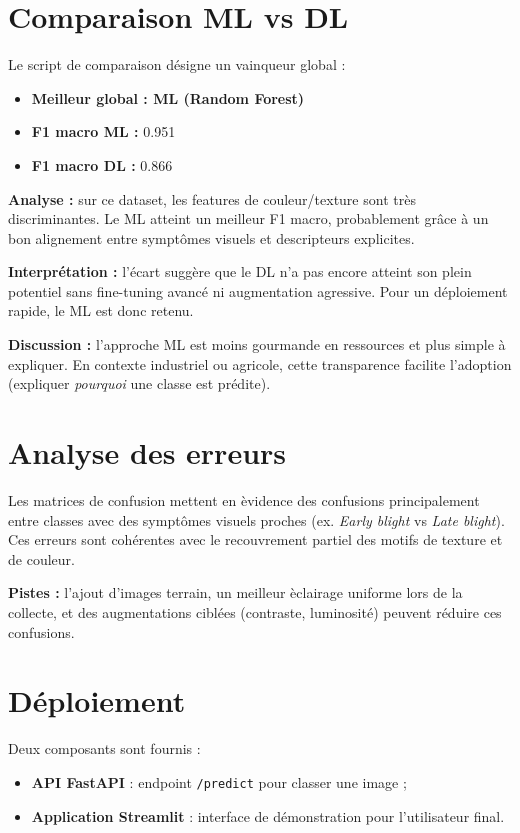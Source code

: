 \documentclass[12pt,a4paper]{article}
\begin{document}
\section{Comparaison ML vs DL}
Le script de comparaison d\'esigne un vainqueur global :
\begin{itemize}[leftmargin=*]
    \item \textbf{Meilleur global : ML (Random Forest)}
    \item \textbf{F1 macro ML :} 0.951
    \item \textbf{F1 macro DL :} 0.866
\end{itemize}

\textbf{Analyse :} sur ce dataset, les features de couleur/texture sont tr\`es discriminantes. Le ML atteint un meilleur F1 macro, probablement gr\^ace \`a un bon alignement entre sympt\^omes visuels et descripteurs explicites.

\textbf{Interpr\'etation :} l'\'ecart sugg\`ere que le DL n'a pas encore atteint son plein potentiel sans fine-tuning avanc\'e ni augmentation agressive. Pour un d\'eploiement rapide, le ML est donc retenu.

\textbf{Discussion :} l'approche ML est moins gourmande en ressources et plus simple \`a expliquer. En contexte industriel ou agricole, cette transparence facilite l'adoption (expliquer \textit{pourquoi} une classe est pr\'edite).

\section{Analyse des erreurs}
Les matrices de confusion mettent en \`evidence des confusions principalement entre classes avec des sympt\^omes visuels proches (ex. \textit{Early blight} vs \textit{Late blight}). Ces erreurs sont coh\'erentes avec le recouvrement partiel des motifs de texture et de couleur.

\textbf{Pistes :} l'ajout d'images terrain, un meilleur \`eclairage uniforme lors de la collecte, et des augmentations cibl\'ees (contraste, luminosit\'e) peuvent r\'eduire ces confusions.

\section{D\'eploiement}
Deux composants sont fournis :
\begin{itemize}[leftmargin=*]
    \item \textbf{API FastAPI} : endpoint \texttt{/predict} pour classer une image ;
    \item \textbf{Application Streamlit} : interface de d\'emonstration pour l'utilisateur final.
\end{itemize}
\end{document}
